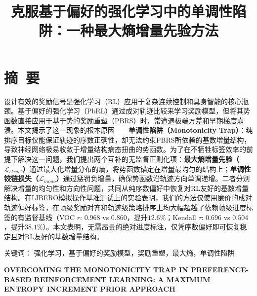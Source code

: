 

\renewcommand{\mytitle}{克服基于偏好的强化学习中的单调性陷阱：一种最大熵增量先验方法}
\renewcommand{\mytitleEN}{OVERCOMING THE MONOTONICITY TRAP IN PREFERENCE-BASED REINFORCEMENT LEARNING: A MAXIMUM ENTROPY INCREMENT PRIOR APPROACH}


\setlength{\baselineskip}{20pt}

\title{\hei{}\bfseries\mytitle}
\maketitle
\thispagestyle{empty}
\clearpage



{\pagestyle{plain}
\tableofcontents
\clearpage}


\section*{摘~要}
设计有效的奖励信号是强化学习（RL）应用于复杂连续控制和具身智能的核心瓶颈。基于偏好的强化学习（PbRL）通过成对轨迹比较来学习奖励模型，但将其势函数直接应用于基于势的奖励重塑（PBRS）时，常遭遇极端方差和早期梯度崩溃。本文揭示了这一现象的根本原因——\textbf{单调性陷阱（Monotonicity Trap）}：纯排序目标仅能保证轨迹的序数正确性，却无法约束PBRS所依赖的基数增量结构，导致神经网络极易收敛于增量结构病态扭曲的势函数。为了在不牺牲标签效率的前提下解决这一问题，我们提出两个互补的无监督正则化项：\textbf{最大熵增量先验（$\mathcal{L}_{struct}$）}通过最大化增量分布的熵，将势函数锚定在增量最均匀的结构上；\textbf{单调性铰链损失（$\mathcal{L}_{mono}$）}通过惩罚负增量，确保势函数沿轨迹方向单调递增。二者分别解决增量的均匀性和方向性问题，共同从纯序数偏好中恢复对RL友好的基数增量结构。在LIBERO模拟操作基准测试上的实验表明，我们的方法仅使用廉价的成对轨迹偏好标签，在帧级奖励对齐和轨迹级策略排序上均大幅超越了依赖帧级进度标签的有监督基线（VOC $r$: $0.968$ vs $0.860$，提升$12.6\%$；Kendall $\tau$: $0.696$ vs $0.504$，提升$38.1\%$）。本文表明，无需昂贵的绝对进度标注，仅凭序数偏好即可恢复稳定且对RL友好的基数增量结构。

\vspace{1em}\noindent
{\hei 关键词：}
{\song 强化学习，基于偏好的奖励模型，奖励重塑，最大熵，单调性陷阱}
\clearpage



{\centering{}\bfseries\sffamily \mytitleEN\par}
\vspace{1em}
